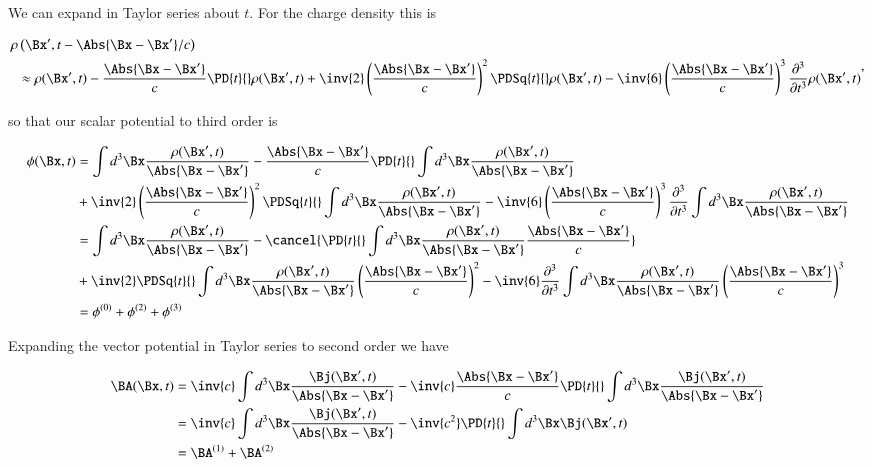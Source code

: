 We can expand in Taylor series about $t$.  For the charge density this is

\begin{equation}\label{eqn:relativisticElectrodynamicsL27:30}
\begin{aligned}
\rho&\left(\Bx', t - \Abs{\Bx - \Bx'}/c\right) \\
&\approx 
\rho(\Bx', t) 
- \frac{\Abs{\Bx - \Bx'}}{c} \PD{t}{} \rho(\Bx', t) 
+ \inv{2} \left(\frac{\Abs{\Bx - \Bx'}}{c}\right)^2 \PDSq{t}{} \rho(\Bx', t) 
- \inv{6} \left(\frac{\Abs{\Bx - \Bx'}}{c}\right)^3 \frac{\partial^3}{\partial t^3} \rho(\Bx', t) 
\end{aligned},
\end{equation}

so that our scalar potential to third order is

\begin{align*}
\phi(\Bx, t) 
&=
\int d^3 \Bx \frac{\rho(\Bx', t) }{\Abs{\Bx - \Bx'}}
- \frac{\Abs{\Bx - \Bx'}}{c} \PD{t}{} \int d^3 \Bx \frac{\rho(\Bx', t) }{\Abs{\Bx - \Bx'}} \\
&+ \inv{2} \left(\frac{\Abs{\Bx - \Bx'}}{c}\right)^2 \PDSq{t}{} \int d^3 \Bx \frac{\rho(\Bx', t) }{\Abs{\Bx - \Bx'}}
- \inv{6} \left(\frac{\Abs{\Bx - \Bx'}}{c}\right)^3 \frac{\partial^3}{\partial t^3} \int d^3 \Bx \frac{\rho(\Bx', t) }{\Abs{\Bx - \Bx'}} \\
&=
\int d^3 \Bx \frac{\rho(\Bx', t) }{\Abs{\Bx - \Bx'}}
- 
\cancel{\PD{t}{} \int d^3 \Bx \frac{\rho(\Bx', t) }{\Abs{\Bx - \Bx'}} 
\frac{\Abs{\Bx - \Bx'}}{c} }
\\
&+ \inv{2} 
\PDSq{t}{} \int d^3 \Bx \frac{\rho(\Bx', t) }{\Abs{\Bx - \Bx'}}
\left(\frac{\Abs{\Bx - \Bx'}}{c}\right)^2 
- \inv{6} 
\frac{\partial^3}{\partial t^3} \int d^3 \Bx \frac{\rho(\Bx', t) }{\Abs{\Bx - \Bx'}} 
\left(\frac{\Abs{\Bx - \Bx'}}{c}\right)^3  \\
&= \phi^{(0)} + \phi^{(2)} + \phi^{(3)}
\end{align*}

Expanding the vector potential in Taylor series to second order we have

\begin{align*}
\BA(\Bx, t) 
&=
\inv{c} \int d^3 \Bx \frac{\Bj(\Bx', t) }{\Abs{\Bx - \Bx'}}
- \inv{c} \frac{\Abs{\Bx - \Bx'}}{c} \PD{t}{} \int d^3 \Bx \frac{\Bj(\Bx', t) }{\Abs{\Bx - \Bx'}} \\
&=
\inv{c} \int d^3 \Bx \frac{\Bj(\Bx', t) }{\Abs{\Bx - \Bx'}}
- 
\inv{c^2} \PD{t}{} \int d^3 \Bx \Bj(\Bx', t) 
\\
&= \BA^{(1)} + \BA^{(2)} 
\end{align*}

